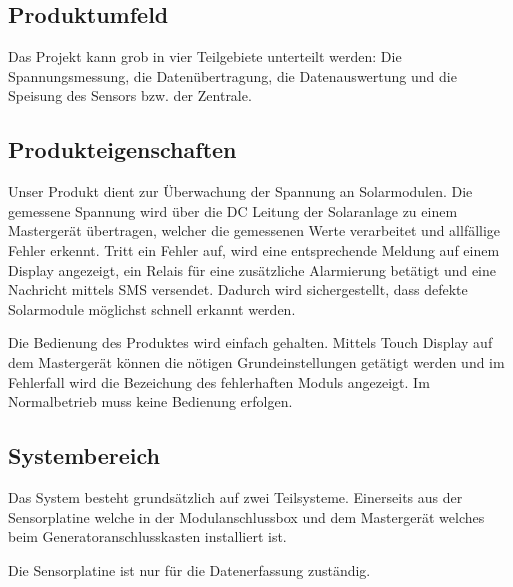 \subsection{Produktumfeld}

Das   Projekt   kann  grob   in   vier   Teilgebiete  unterteilt   werden: Die
Spannungsmessung, die Daten\"ubertragung, die Datenauswertung und die Speisung
des Sensors bzw. der Zentrale.


\subsection{Produkteigenschaften}

Unser  Produkt  dient  zur  \"Uberwachung der  Spannung  an  Solarmodulen. Die
gemessene  Spannung  wird \"uber  die  DC  Leitung  der Solaranlage  zu  einem
Masterger\"at  \"ubertragen,  welcher  die gemessenen  Werte  verarbeitet  und
allf\"allige  Fehler erkennt. Tritt  ein Fehler  auf, wird  eine entsprechende
Meldung  auf einem  Display  angezeigt, ein  Relais  f\"ur eine  zus\"atzliche
Alarmierung bet\"atigt und eine  Nachricht mittels SMS versendet. Dadurch wird
sichergestellt, dass defekte Solarmodule m\"oglichst schnell erkannt werden.

Die Bedienung des  Produktes wird einfach gehalten. Mittels  Touch Display auf
dem Masterger\"at k\"onnen die  n\"otigen Grundeinstellungen get\"atigt werden
und im  Fehlerfall wird die  Bezeichung des fehlerhaften  Moduls angezeigt. Im
Normalbetrieb muss keine Bedienung erfolgen.


\subsection{Systembereich}

Das System  besteht grunds\"atzlich  auf zwei Teilsysteme. Einerseits  aus der
Sensorplatine welche  in der  Modulanschlussbox und dem  Masterger\"at welches
beim Generatoranschlusskasten installiert ist.

Die Sensorplatine ist nur f\"ur die Datenerfassung zust\"andig.


